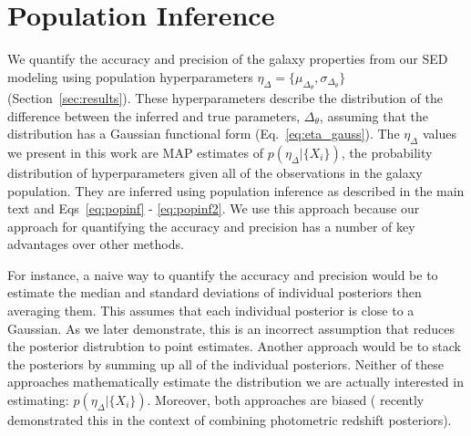 \section{Population Inference} \label{sec:hyper}
We quantify the accuracy and precision of the galaxy properties from our SED
modeling using population hyperparameters $\eta_{\Delta} =
\{\mu_{\Delta_\theta}, \sigma_{\Delta_\theta}\}$ (Section~\ref{sec:results}). 
These hyperparameters describe the distribution of the difference between the
inferred and true parameters, $\Delta_{\theta}$, assuming that the distribution
has a Gaussian functional form (Eq.~\ref{eq:eta_gauss}). 
The $\eta_\Delta$ values we present in this work are MAP estimates of
$p(\eta_\Delta | \{ X_i \})$, the probability distribution of hyperparameters
given all of the observations in the galaxy population. 
They are inferred using population inference as described in the main text and
Eqs~\ref{eq:popinf} - \ref{eq:popinf2}.
We use this approach because our approach for quantifying the accuracy and
precision has a number of key advantages over other methods. 

For instance, a naive way to quantify the accuracy and precision would be to
estimate the median and standard deviations of individual posteriors then
averaging them. 
This assumes that each individual posterior is close to a Gaussian. 
As we later demonstrate, this is an incorrect assumption that reduces the
posterior distrubtion to point estimates. 
Another approach would be to stack the posteriors by summing up all of the
individual posteriors. 
Neither of these approaches mathematically estimate the distribution we are
actually interested in estimating: $p(\eta_\Delta | \{ X_i \})$. 
Moreover, both approaches are biased (\cite{malz2020} recently demonstrated
this in the context of combining photometric redshift posteriors). 

